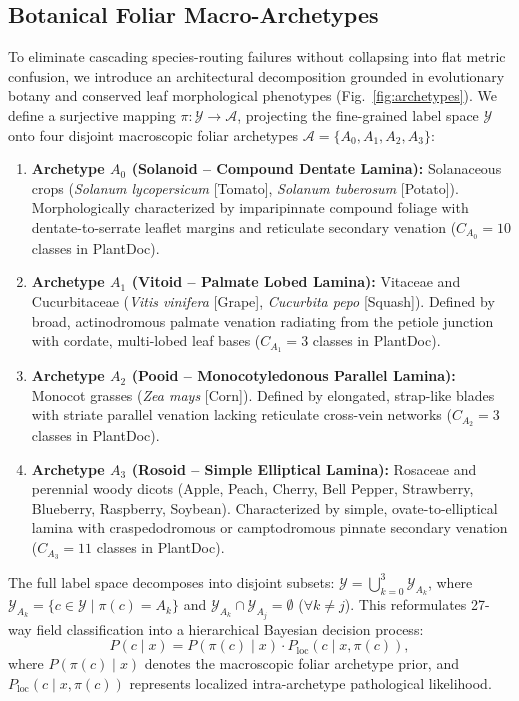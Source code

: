 \subsection{Botanical Foliar Macro-Archetypes}
\label{subsec:foliar_macro_archetypes}
To eliminate cascading species-routing failures without collapsing into flat metric confusion, we introduce an architectural decomposition grounded in evolutionary botany and conserved leaf morphological phenotypes (Fig.~\ref{fig:archetypes}). We define a surjective mapping $\pi: \mathcal{Y} \to \mathcal{A}$, projecting the fine-grained label space $\mathcal{Y}$ onto four disjoint macroscopic foliar archetypes $\mathcal{A} = \{A_0, A_1, A_2, A_3\}$:
\begin{enumerate}
    \item \textbf{Archetype $A_0$ (Solanoid -- Compound Dentate Lamina):} Solanaceous crops (\textit{Solanum lycopersicum} [Tomato], \textit{Solanum tuberosum} [Potato]). Morphologically characterized by imparipinnate compound foliage with dentate-to-serrate leaflet margins and reticulate secondary venation ($C_{A_0} = 10$ classes in PlantDoc).
    \item \textbf{Archetype $A_1$ (Vitoid -- Palmate Lobed Lamina):} Vitaceae and Cucurbitaceae (\textit{Vitis vinifera} [Grape], \textit{Cucurbita pepo} [Squash]). Defined by broad, actinodromous palmate venation radiating from the petiole junction with cordate, multi-lobed leaf bases ($C_{A_1} = 3$ classes in PlantDoc).
    \item \textbf{Archetype $A_2$ (Pooid -- Monocotyledonous Parallel Lamina):} Monocot grasses (\textit{Zea mays} [Corn]). Defined by elongated, strap-like blades with striate parallel venation lacking reticulate cross-vein networks ($C_{A_2} = 3$ classes in PlantDoc).
    \item \textbf{Archetype $A_3$ (Rosoid -- Simple Elliptical Lamina):} Rosaceae and perennial woody dicots (Apple, Peach, Cherry, Bell Pepper, Strawberry, Blueberry, Raspberry, Soybean). Characterized by simple, ovate-to-elliptical lamina with craspedodromous or camptodromous pinnate secondary venation ($C_{A_3} = 11$ classes in PlantDoc).
\end{enumerate}

The full label space decomposes into disjoint subsets: $\mathcal{Y} = \bigcup_{k=0}^3 \mathcal{Y}_{A_k}$, where $\mathcal{Y}_{A_k} = \{c \in \mathcal{Y} \mid \pi(c) = A_k\}$ and $\mathcal{Y}_{A_k} \cap \mathcal{Y}_{A_j} = \emptyset$ ($\forall k \ne j$). This reformulates 27-way field classification into a hierarchical Bayesian decision process:
\begin{equation}
    P(c \mid x) = P(\pi(c) \mid x) \cdot P_{\text{loc}}(c \mid x, \pi(c)),
    \label{eq:hierarchical_bayes_base}
\end{equation}
where $P(\pi(c) \mid x)$ denotes the macroscopic foliar archetype prior, and $P_{\text{loc}}(c \mid x, \pi(c))$ represents localized intra-archetype pathological likelihood.